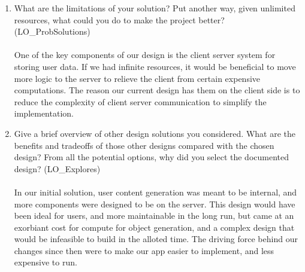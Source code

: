 \documentclass[12pt, titlepage]{article}
\begin{document}
\begin{enumerate}
  \item What are the limitations of your solution?  Put another way, given
        unlimited resources, what could you do to make the project better? (LO\_ProbSolutions)\\ \\
        One of the key components of our design is the client server system for storing user data.
        If we had infinite resources, it would be beneficial to move more logic to the server to relieve the client from certain expensive computations.
        The reason our current design has them on the client side is to reduce the complexity of client server communication to simplify the implementation. \\

  \item Give a brief overview of other design solutions you considered.  What
        are the benefits and tradeoffs of those other designs compared with the chosen
        design?  From all the potential options, why did you select the documented design?
        (LO\_Explores)\\ \\
        In our initial solution, user content generation was meant to be internal, and more components were designed to be on the server. This design would have been ideal for users, and more maintainable in the long run, but came at an exorbiant cost for compute for object generation, and a complex design that would be infeasible to build in the alloted time.
        The driving force behind our changes since then were to make our app easier to implement, and less expensive to run. \\
\end{enumerate}
\end{document}
